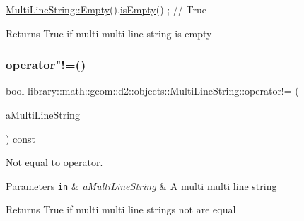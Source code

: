 \begin{DoxyCode}
\hyperlink{classlibrary_1_1math_1_1geom_1_1d2_1_1objects_1_1_multi_line_string_aaa30610df3584b30f80e33ff0f5cd8bb}{MultiLineString::Empty}().\hyperlink{classlibrary_1_1math_1_1geom_1_1d2_1_1objects_1_1_multi_line_string_a41b9e07b94cdbe7c2cc9fc49ce8f2d10}{isEmpty}() ; \textcolor{comment}{// True}
\end{DoxyCode}


\begin{DoxyReturn}{Returns}
True if multi multi line string is empty 
\end{DoxyReturn}
\mbox{\label{classlibrary_1_1math_1_1geom_1_1d2_1_1objects_1_1_multi_line_string_aa3bde774845839971ad6fd89200fdb76}} 
\subsubsection{\texorpdfstring{operator"!=()}{operator!=()}}
{\footnotesize\ttfamily bool library\+::math\+::geom\+::d2\+::objects\+::\+Multi\+Line\+String\+::operator!= (\begin{DoxyParamCaption}\item[{const \hyperlink{classlibrary_1_1math_1_1geom_1_1d2_1_1objects_1_1_multi_line_string}{Multi\+Line\+String} \&}]{a\+Multi\+Line\+String }\end{DoxyParamCaption}) const}



Not equal to operator. 


\begin{DoxyParams}[1]{Parameters}
\mbox{\tt in}  & {\em a\+Multi\+Line\+String} & A multi multi line string \\
\hline
\end{DoxyParams}
\begin{DoxyReturn}{Returns}
True if multi multi line strings not are equal 
\end{DoxyReturn}
\mbox{\label{classlibrary_1_1math_1_1geom_1_1d2_1_1objects_1_1_multi_line_string_abc2730ad53ff446aa68f60b28bbfd396}} 
